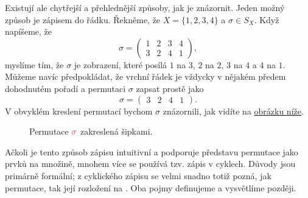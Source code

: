 Existují ale chytřejší a přehlednější způsoby, jak je znázornit. Jeden možný
způsob je zápisem do řádku. Řekněme, že $X = \{1,2,3,4\}$ a $\sigma \in S_X$.
Když napíšeme, že
\[
 \sigma = 
 \begin{pmatrix}
  1 & 2 & 3 & 4\\
  3 & 2 & 4 & 1
 \end{pmatrix},
\]
myslíme tím, že $\sigma$ je zobrazení, které posílá $1$ na $3$, $2$ na $2$, $3$
na $4$ a $4$ na $1$. Můžeme navíc předpokládat, že vrchní řádek je vždycky v
nějakém předem dohodnutém pořadí a permutaci $\sigma$ zapsat prostě jako
\[
 \sigma = \begin{pmatrix} 
 3 & 2 & 4 & 1
 \end{pmatrix}. 
\]
V obvyklém kreslení permutací bychom $\sigma$ znázornili, jak vidíte na 
\hyperref[fig:permutace-jako-sipky]{obrázku níže}.
\begin{figure}[h]
 \centering
 \label{fig:permutace-jako-sipky}
 \caption{Permutace $\clr{\sigma}$ zakreslená šipkami.}
\end{figure}

Ačkoli je tento způsob zápisu intuitivní a podporuje představu permutace jako
 prvků na množině, mnohem více se používá tzv. zápis v cyklech.
Důvody jsou primárně formální; z cyklického zápisu se velmi snadno totiž pozná,
jak  permutace, tak její rozložení na . Oba pojmy
definujeme a vysvětlíme později.


